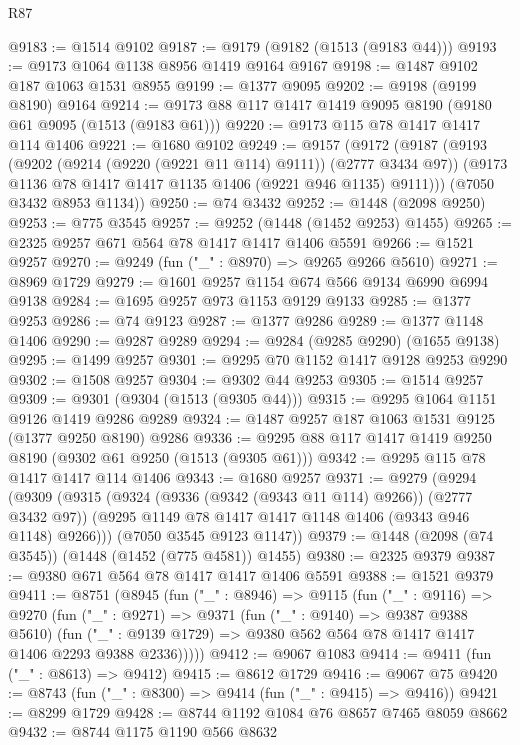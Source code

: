 \begin{lexlean}{R87}
\begin{coremodule}
{{@9183 := @1514 @9102
@9187 := @9179 (@9182 (@1513 (@9183 @44)))
@9193 := @9173 @1064 @1138 @8956 @1419 @9164 @9167
@9198 := @1487 @9102 @187 @1063 @1531 @8955
@9199 := @1377 @9095
@9202 := @9198 (@9199 @8190) @9164
@9214 := @9173 @88 @117 @1417 @1419 @9095 @8190 (@9180 @61 @9095 (@1513 (@9183 @61)))
@9220 := @9173 @115 @78 @1417 @1417 @114 @1406
@9221 := @1680 @9102
@9249 := @9157
    (@9172
      (@9187
        (@9193
          (@9202 (@9214 (@9220 (@9221 @11 @114) @9111)) (@2777 @3434 @97))
          (@9173 @1136 @78 @1417 @1417 @1135 @1406 (@9221 @946 @1135) @9111)))
      (@7050 @3432 @8953 @1134))
@9250 := @74 @3432
@9252 := @1448 (@2098 @9250)
@9253 := @775 @3545
@9257 := @9252 (@1448 (@1452 @9253) @1455)
@9265 := @2325 @9257 @671 @564 @78 @1417 @1417 @1406 @5591
@9266 := @1521 @9257
@9270 := @9249 (fun ("_" : @8970) => @9265 @9266 @5610)
@9271 := @8969 @1729
@9279 := @1601 @9257 @1154 @674 @566 @9134 @6990 @6994 @9138
@9284 := @1695 @9257 @973 @1153 @9129 @9133
@9285 := @1377 @9253
@9286 := @74 @9123
@9287 := @1377 @9286
@9289 := @1377 @1148 @1406
@9290 := @9287 @9289
@9294 := @9284 (@9285 @9290) (@1655 @9138)
@9295 := @1499 @9257
@9301 := @9295 @70 @1152 @1417 @9128 @9253 @9290
@9302 := @1508 @9257
@9304 := @9302 @44 @9253
@9305 := @1514 @9257
@9309 := @9301 (@9304 (@1513 (@9305 @44)))
@9315 := @9295 @1064 @1151 @9126 @1419 @9286 @9289
@9324 := @1487 @9257 @187 @1063 @1531 @9125 (@1377 @9250 @8190) @9286
@9336 := @9295 @88 @117 @1417 @1419 @9250 @8190 (@9302 @61 @9250 (@1513 (@9305 @61)))
@9342 := @9295 @115 @78 @1417 @1417 @114 @1406
@9343 := @1680 @9257
@9371 := @9279
    (@9294
      (@9309
        (@9315
          (@9324 (@9336 (@9342 (@9343 @11 @114) @9266)) (@2777 @3432 @97))
          (@9295 @1149 @78 @1417 @1417 @1148 @1406 (@9343 @946 @1148) @9266)))
      (@7050 @3545 @9123 @1147))
@9379 := @1448 (@2098 (@74 @3545)) (@1448 (@1452 (@775 @4581)) @1455)
@9380 := @2325 @9379
@9387 := @9380 @671 @564 @78 @1417 @1417 @1406 @5591
@9388 := @1521 @9379
@9411 := @8751
    (@8945
      (fun ("_" : @8946) =>
      @9115
        (fun ("_" : @9116) =>
        @9270
          (fun ("_" : @9271) =>
          @9371
            (fun ("_" : @9140) => @9387 @9388 @5610)
            (fun ("_" : @9139 @1729) => @9380 @562 @564 @78 @1417 @1417 @1406 @2293 @9388 @2336)))))
@9412 := @9067 @1083
@9414 := @9411 (fun ("_" : @8613) => @9412)
@9415 := @8612 @1729
@9416 := @9067 @75
@9420 := @8743 (fun ("_" : @8300) => @9414 (fun ("_" : @9415) => @9416))
@9421 := @8299 @1729
@9428 := @8744 @1192 @1084 @76 @8657 @7465 @8059 @8662
@9432 := @8744 @1175 @1190 @566 @8632
}}
\end{coremodule}
\end{lexlean}

